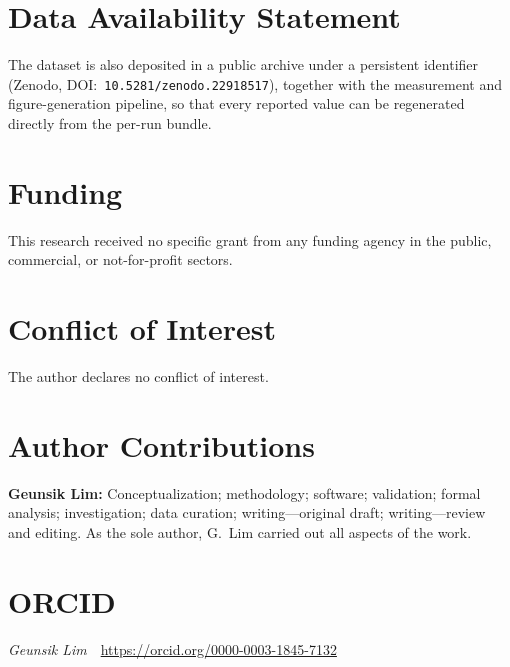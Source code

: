 
\section*{Data Availability Statement}
\MeasurementAvailability{} The dataset is also deposited in a public archive
under a persistent identifier (Zenodo, DOI:~\texttt{10.5281/zenodo.22918517}),
together with the measurement and figure-generation pipeline, so that every
reported value can be regenerated directly from the per-run bundle.

\section*{Funding}
This research received no specific grant from any funding agency in the public,
commercial, or not-for-profit sectors.

\section*{Conflict of Interest}
The author declares no conflict of interest.

\section*{Author Contributions}
\textbf{Geunsik Lim:} Conceptualization; methodology; software; validation;
formal analysis; investigation; data curation; writing---original draft;
writing---review and editing. As the sole author, G.~Lim carried out all
aspects of the work.

\section*{ORCID}
\noindent\textit{Geunsik Lim}~~\url{https://orcid.org/0000-0003-1845-7132}

